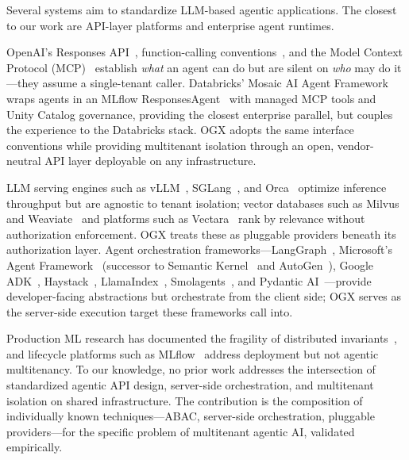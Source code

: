 \documentclass[sigconf]{acmart}
\begin{document}
Several systems aim to standardize LLM-based agentic applications. The closest to our work are API-layer platforms and enterprise agent runtimes.

OpenAI's Responses API~\cite{openaiResponsesAPI}, function-calling conventions~\cite{openaiFunctionCalling}, and the Model Context Protocol (MCP)~\cite{mcp} establish \emph{what} an agent can do but are silent on \emph{who} may do it---they assume a single-tenant caller. Databricks' Mosaic AI Agent Framework~\cite{databricksAgentFramework} wraps agents in an MLflow ResponsesAgent~\cite{mlflow,databricksResponsesAgent} with managed MCP tools and Unity Catalog governance, providing the closest enterprise parallel, but couples the experience to the Databricks stack. OGX adopts the same interface conventions while providing multitenant isolation through an open, vendor-neutral API layer deployable on any infrastructure.

LLM serving engines such as vLLM~\cite{kwon2023vllm}, SGLang~\cite{sglang}, and Orca~\cite{yu2022orca} optimize inference throughput but are agnostic to tenant isolation; vector databases such as Milvus~\cite{milvus} and Weaviate~\cite{weaviate} and platforms such as Vectara~\cite{vectara} rank by relevance without authorization enforcement. OGX treats these as pluggable providers beneath its authorization layer. Agent orchestration frameworks---LangGraph~\cite{langgraph}, Microsoft's Agent Framework~\cite{microsoftAgentFramework} (successor to Semantic Kernel~\cite{semanticKernel} and AutoGen~\cite{autogen}), Google ADK~\cite{googleADK}, Haystack~\cite{haystack}, LlamaIndex~\cite{llamaindex}, Smolagents~\cite{smolagents}, and Pydantic AI~\cite{pydanticai}---provide developer-facing abstractions but orchestrate from the client side; OGX serves as the server-side execution target these frameworks call into.

Production ML research has documented the fragility of distributed invariants~\cite{sculley2015hiddentechnicaldebt,amershi2019se4ml}, and lifecycle platforms such as MLflow~\cite{mlflow} address deployment but not agentic multitenancy. To our knowledge, no prior work addresses the intersection of standardized agentic API design, server-side orchestration, and multitenant isolation on shared infrastructure. The contribution is the composition of individually known techniques---ABAC, server-side orchestration, pluggable providers---for the specific problem of multitenant agentic AI, validated empirically.
\end{document}
